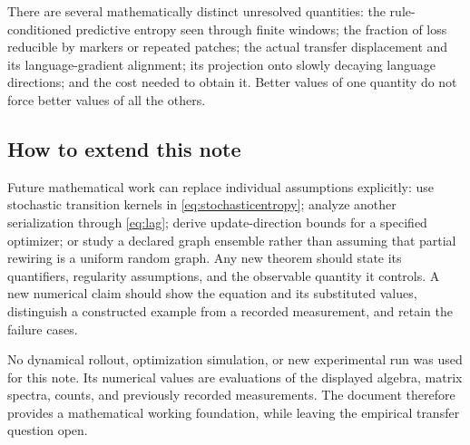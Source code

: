 There are several mathematically distinct unresolved quantities:
the rule-conditioned predictive entropy seen through finite windows;
the fraction of loss reducible by markers or repeated patches;
the actual transfer displacement and its language-gradient alignment;
its projection onto slowly decaying language directions;
and the cost needed to obtain it. Better values of one quantity do not
force better values of all the others.

\subsection{How to extend this note}

Future mathematical work can replace individual assumptions explicitly:
use stochastic transition kernels in \eqref{eq:stochasticentropy};
analyze another serialization through \eqref{eq:lag};
derive update-direction bounds for a specified optimizer;
or study a declared graph ensemble rather than assuming that partial
rewiring is a uniform random graph.
Any new theorem should state its quantifiers, regularity assumptions,
and the observable quantity it controls. A new numerical claim should
show the equation and its substituted values, distinguish a constructed
example from a recorded measurement, and retain the failure cases.

No dynamical rollout, optimization simulation, or new experimental run
was used for this note. Its numerical values are evaluations of the
displayed algebra, matrix spectra, counts, and previously recorded
measurements. The document therefore provides a mathematical working
foundation, while leaving the empirical transfer question open.

